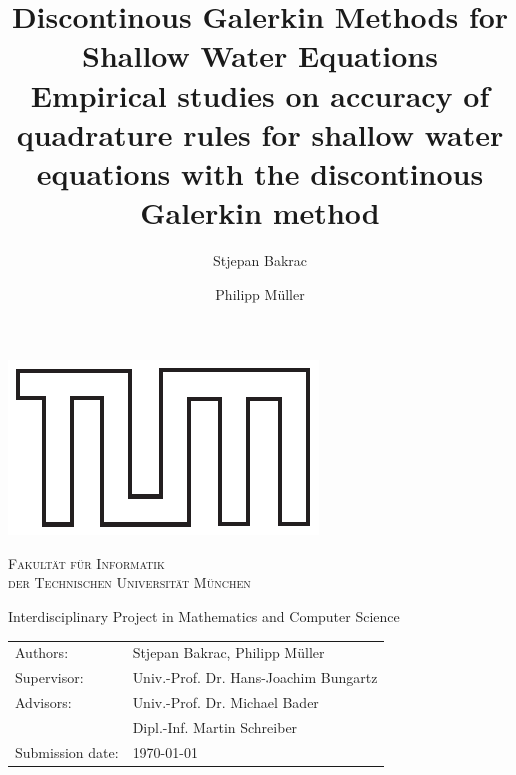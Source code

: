 \documentclass[a4paper, twoside]{article}
\title{Discontinous Galerkin Methods for Shallow Water Equations\\
  \vspace{.2cm}
\large{Empirical studies on accuracy of quadrature rules for shallow water equations with the discontinous Galerkin method}
}
\author{Stjepan Bakrac \and Philipp M\"uller}
\date{}
\begin{document}
\thispagestyle{empty}
\makeatletter
\begin{titlepage}
\vspace*{\fill}
\begin{center}
  \includegraphics[scale=0.75]{TUM.pdf}

  \vspace{.5cm}
  \textsc{ \Large Fakultät für Informatik\\\vspace{.2cm}
    \large der Technischen Universität München}

  \vspace{1cm}

  \large Interdisciplinary Project in Mathematics and Computer Science

  \vspace{.4cm}

  \LARGE
  \@title

  \vspace{1cm}
  \vfill{}
  \begin{tabular}{ll}
    Authors:         & Stjepan Bakrac, Philipp Müller \\
    Supervisor:      & Univ.-Prof. Dr. Hans-Joachim Bungartz \\
    Advisors:        & Univ.-Prof. Dr. Michael Bader \\
                     & Dipl.-Inf. Martin Schreiber \\
    Submission date: & \today
  \end{tabular}

  \vspace{1cm}

\end{center}
\vspace*{\fill}
\end{titlepage}
\makeatother
\end{document}
